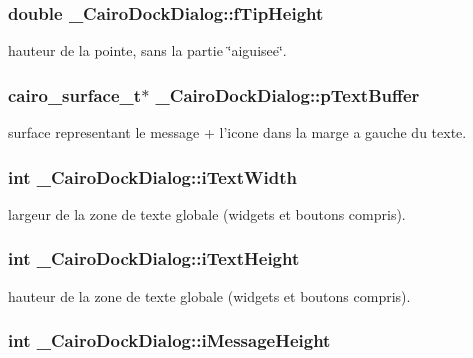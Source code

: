 \subsubsection{\setlength{\rightskip}{0pt plus 5cm}double {\bf \_\-CairoDockDialog::fTipHeight}}\label{struct__CairoDockDialog_210d41b9cbdea2dac8cba77ba33d2ef0}


hauteur de la pointe, sans la partie \char`\"{}aiguisee\char`\"{}. 

\subsubsection{\setlength{\rightskip}{0pt plus 5cm}cairo\_\-surface\_\-t$\ast$ {\bf \_\-CairoDockDialog::pTextBuffer}}\label{struct__CairoDockDialog_dfa4889a4aa5f0e53eecd51ea58cd4b1}


surface representant le message + l'icone dans la marge a gauche du texte. 

\subsubsection{\setlength{\rightskip}{0pt plus 5cm}int {\bf \_\-CairoDockDialog::iTextWidth}}\label{struct__CairoDockDialog_67a5b552c39b03b2a251e7f5dcd8e034}


largeur de la zone de texte globale (widgets et boutons compris). 

\subsubsection{\setlength{\rightskip}{0pt plus 5cm}int {\bf \_\-CairoDockDialog::iTextHeight}}\label{struct__CairoDockDialog_4b672e33300187a5b94c2a0cff999658}


hauteur de la zone de texte globale (widgets et boutons compris). 

\subsubsection{\setlength{\rightskip}{0pt plus 5cm}int {\bf \_\-CairoDockDialog::iMessageHeight}}\label{struct__CairoDockDialog_dcd7d6ef7102243f3854cce8e0c15564}


